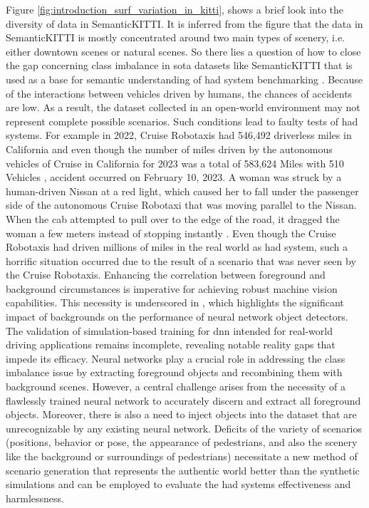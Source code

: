 Figure \ref{fig:introduction_surf_variation_in_kitti}, shows a brief look into the diversity of data in SemanticKITTI. It is inferred from the figure that the data in SemanticKITTI is mostly concentrated around two main types of scenery, i.e. either downtown scenes or natural scenes. So there lies a question of how to close the gap concerning class imbalance in \acrfull{sota} datasets like SemanticKITTI that is used as a base for semantic understanding of \acrshort{had} system benchmarking \parencite{papers-with-code}. Because of the interactions between vehicles driven by humans, the chances of accidents are low. As a result, the dataset collected in an open-world environment may not represent complete possible scenarios. Such conditions lead to faulty tests of \acrshort{had} systems. For example in 2022, Cruise Robotaxis had 546,492 driverless miles in California and even though the number of miles driven by the autonomous vehicles of Cruise in California for 2023 was a total of 583,624 Miles with 510 Vehicles \parencite{disengagement_report}, accident occurred on February 10, 2023. A woman was struck by a human-driven Nissan at a red light, which caused her to fall under the passenger side of the autonomous Cruise Robotaxi that was moving parallel to the Nissan. When the cab attempted to pull over to the edge of the road, it dragged the woman a few meters instead of stopping instantly \parencite{cruise_crash}. Even though the Cruise Robotaxis had driven millions of miles in the real world as \acrshort{had} system, such a horrific situation occurred due to the result of a scenario that was never seen by the Cruise Robotaxis. 
Enhancing the correlation between foreground and background circumstances is imperative for achieving robust machine vision capabilities. This necessity is underscored in \parencite{noise_or_signal}, which highlights the significant impact of backgrounds on the performance of neural network object detectors.
The validation of simulation-based training for \acrshort{dnn} intended for real-world driving applications remains incomplete, revealing notable reality gaps \parencite{care_real_and_syn_gap} that impede its efficacy.
Neural networks play a crucial role in addressing the class imbalance issue by extracting foreground objects and recombining them with background scenes. However, a central challenge arises from the necessity of a flawlessly trained neural network to accurately discern and extract all foreground objects. Moreover, there is also a need to inject objects into the dataset that are unrecognizable by any existing neural network.
Deficits of the variety of scenarios (positions, behavior or pose, the appearance of pedestrians, and also the scenery like the background or surroundings of pedestrians) necessitate a new method of scenario generation that represents the authentic world better than the synthetic simulations and can be employed to evaluate the \acrshort{had} systems effectiveness and harmlessness.

